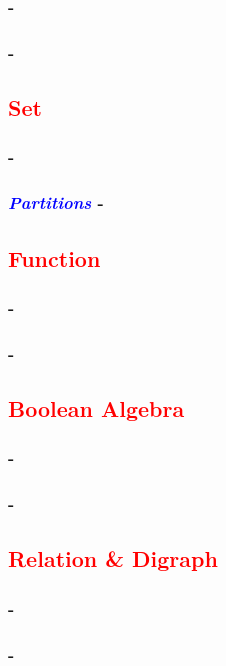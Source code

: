 \documentclass{article}
\def\topic#1{\textcolor{red}{\sc #1}}
\def\sect#1{\textcolor{blue}{\textsl{#1}}}
\begin{document}
  \subsubsection*{\sect{} -\ }
  \subsubsection*{\sect{} -\ }
  \clearpage
  \begin{center}
    \section*{\topic{Set}}
  \end{center}
  \subsubsection*{\sect{} -\ }
  \subsubsection*{\sect{Partitions} -\ }
  \clearpage
  \begin{center}
    \section*{\topic{Function}}
  \end{center}
  \subsubsection*{\sect{} -\ }
  \subsubsection*{\sect{} -\ }
  \clearpage
  \begin{center}
    \section*{\topic{Boolean Algebra}}
  \end{center}
  \subsubsection*{\sect{} -\ }
  \subsubsection*{\sect{} -\ }
  \clearpage
  \begin{center}
    \section*{\topic{Relation \& Digraph}}
  \end{center}
  \subsubsection*{\sect{} -\ }
  \subsubsection*{\sect{} -\ }
\end{document}
